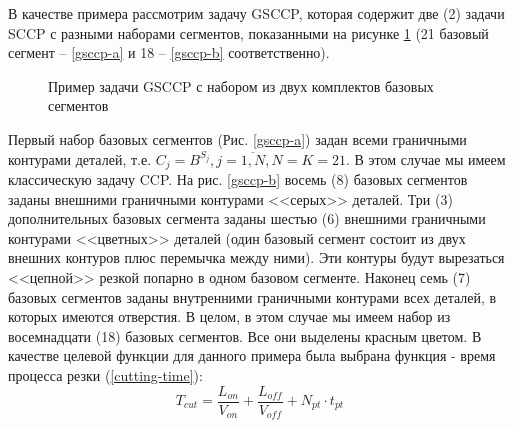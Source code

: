 \documentclass[11pt,twoside]{report}
\begin{document}
В качестве примера рассмотрим задачу GSCCP,
которая содержит две (2)
задачи SCCP с разными наборами сегментов,
показанными на рисунке \ref{gsccp-both}
(21 базовый сегмент – \ref{gsccp-a}
и 18 – \ref{gsccp-b} соответственно).

\begin{figure}
  \centering
  \caption{Пример задачи GSCCP с набором из двух комплектов базовых сегментов}
  \label{gsccp-both}
\end{figure}

Первый набор базовых сегментов (Рис. \ref{gsccp-a})
задан всеми граничными контурами деталей, т.е.
$C_j = B^{S_j}, j=\overline{1,N}, N=K=21$.
В этом случае мы имеем классическую задачу CCP.
На рис. \ref{gsccp-b} восемь (8)
базовых сегментов заданы внешними граничными контурами <<серых>> деталей.
Три (3) дополнительных базовых сегмента заданы шестью (6)
внешними граничными контурами <<цветных>> деталей
(один базовый сегмент состоит из двух внешних контуров плюс перемычка между ними).
Эти контуры будут вырезаться <<цепной>> резкой попарно в одном базовом сегменте.
Наконец семь (7) базовых сегментов заданы внутренними
граничными контурами всех деталей,
в которых имеются отверстия.
В целом, в этом случае мы имеем набор из восемнадцати (18)
базовых сегментов.
Все они выделены красным цветом.
В качестве целевой функции для данного примера была выбрана функция - время процесса резки (\ref{cutting-time}):
$$
T_{cut} = \frac{L_{on}}{V_{on}} + \frac{L_{off}}{V_{off}} +N_{pt} \cdot t_{pt}
$$
\end{document}
